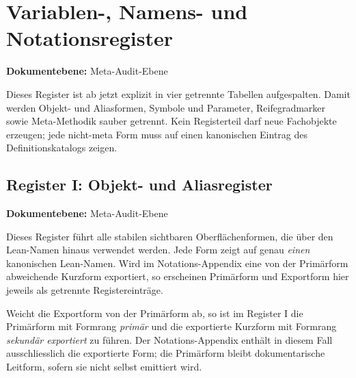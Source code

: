 \documentclass[11pt,a4paper]{article}
\newcommand{\doclevel}[1]{\par\small\noindent\textbf{Dokumentebene:} #1\par\normalsize\medskip}
\begin{document}
\section{Variablen-, Namens- und Notationsregister}
\doclevel{Meta-Audit-Ebene}
\label{app:register}
Dieses Register ist ab jetzt explizit in vier getrennte Tabellen aufgespalten. Damit werden Objekt- und
Aliasformen, Symbole und Parameter, Reifegradmarker sowie Meta-Methodik sauber getrennt. Kein
Registerteil darf neue Fachobjekte erzeugen; jede nicht-meta Form muss auf einen kanonischen Eintrag des
Definitionskatalogs zeigen.

\subsection{Register I: Objekt- und Aliasregister}
\doclevel{Meta-Audit-Ebene}
Dieses Register führt alle stabilen sichtbaren Oberflächenformen, die über den Lean-Namen hinaus
verwendet werden. Jede Form zeigt auf genau \emph{einen} kanonischen Lean-Namen. Wird im
Notations-Appendix eine von der Primärform abweichende Kurzform exportiert, so erscheinen
Primärform und Exportform hier jeweils als getrennte Registereinträge.

Weicht die Exportform von der Primärform ab, so ist im Register I
die Primärform mit Formrang \emph{primär} und die exportierte Kurzform
mit Formrang \emph{sekundär exportiert} zu führen. Der Notations-Appendix
enthält in diesem Fall ausschliesslich die exportierte Form; die Primärform
bleibt dokumentarische Leitform, sofern sie nicht selbst emittiert wird.
\end{document}
